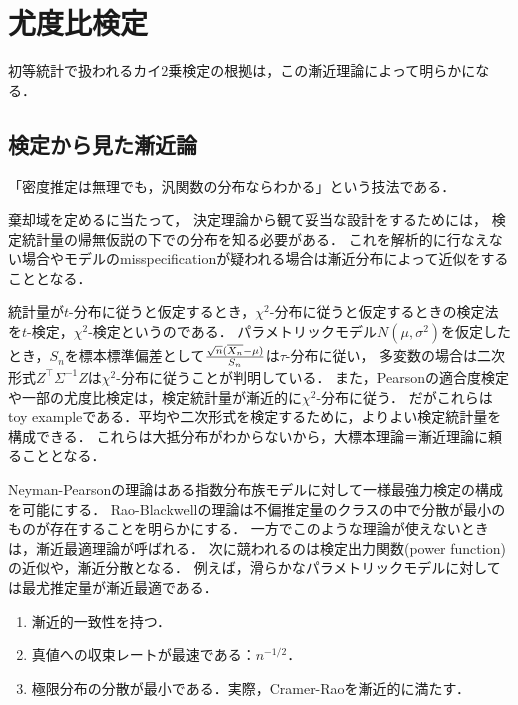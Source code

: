 \documentclass[uplatex,dvipdfmx]{jsreport}
\begin{document}
\section{尤度比検定}

\begin{tcolorbox}[colframe=ForestGreen, colback=ForestGreen!10!white,breakable,colbacktitle=ForestGreen!40!white,coltitle=black,fonttitle=\bfseries\sffamily,
title=]
    初等統計で扱われるカイ$2$乗検定の根拠は，この漸近理論によって明らかになる．
\end{tcolorbox}

\subsection{検定から見た漸近論}

\begin{tcolorbox}[colframe=ForestGreen, colback=ForestGreen!10!white,breakable,colbacktitle=ForestGreen!40!white,coltitle=black,fonttitle=\bfseries\sffamily,
title=]
    「密度推定は無理でも，汎関数の分布ならわかる」という技法である．
\end{tcolorbox}

棄却域を定めるに当たって，
決定理論から観て妥当な設計をするためには，
検定統計量の帰無仮説の下での分布を知る必要がある．
これを解析的に行なえない場合やモデルのmisspecificationが疑われる場合は漸近分布によって近似をすることとなる．

統計量が$t$-分布に従うと仮定するとき，$\chi^2$-分布に従うと仮定するときの検定法を$t$-検定，$\chi^2$-検定というのである．
パラメトリックモデル$N(\mu,\sigma^2)$を仮定したとき，$S_n$を標本標準偏差として$\frac{\sqrt{n}(\overline{X_n}-\mu)}{S_n}$は$\tau$-分布に従い，
多変数の場合は二次形式$Z^\top\Sigma^{-1}Z$は$\chi^2$-分布に従うことが判明している．
また，Pearsonの適合度検定や一部の尤度比検定は，検定統計量が漸近的に$\chi^2$-分布に従う．
だがこれらはtoy exampleである．平均や二次形式を検定するために，よりよい検定統計量を構成できる．
これらは大抵分布がわからないから，大標本理論＝漸近理論に頼ることとなる．

Neyman-Pearsonの理論はある指数分布族モデルに対して一様最強力検定の構成を可能にする．
Rao-Blackwellの理論は不偏推定量のクラスの中で分散が最小のものが存在することを明らかにする．
一方でこのような理論が使えないときは，漸近最適理論が呼ばれる．
次に競われるのは検定出力関数(power function)の近似や，漸近分散となる．
例えば，滑らかなパラメトリックモデルに対しては最尤推定量が漸近最適である．
\begin{enumerate}
    \item 漸近的一致性を持つ．
    \item 真値への収束レートが最速である：$n^{-1/2}$．
    \item 極限分布の分散が最小である．実際，Cramer-Raoを漸近的に満たす．
\end{enumerate}
\end{document}
